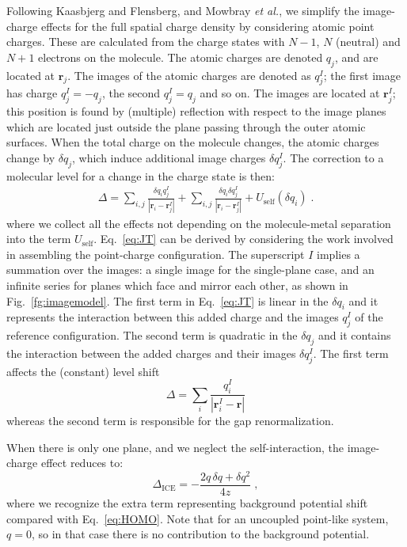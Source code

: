\documentclass[aip,jcp,a4paper,reprint,floatfix,superscriptaddress]{revtex4-1}
\newcommand{\rijI}{|{\bm r}_i-{\bm r}_{j}^I|}
\newcommand{\etal}{\emph{et al.}\xspace}
\newcommand{\txt}[1]{{\text{#1}}}
\begin{document}
Following Kaasbjerg and Flensberg,\cite{Kaasbjerg2008} and Mowbray \etal\cite{Mowbray2008}, we simplify the image-charge effects for the full spatial charge density by considering atomic point charges.
These are calculated from the charge states with $N-1$, $N$ (neutral) and $N+1$ electrons on the molecule. The atomic charges are denoted $q_j$, and are located at ${\bm r}_j$. The images of the atomic charges are denoted as $q^I_j$; the first image has charge $q^I_j= -q_j$, the second $q^I_j = q_j$ and so on.
The images are located at ${\bm r}^I_j$; this position is found by (multiple) reflection with respect to the image planes which are located just outside the plane passing through the outer atomic surfaces.\cite{Smith1989,Quek2007} When the total charge on the molecule changes, the atomic charges change by $\delta q_j$, which induce additional image charges $\delta q^I_j$. The correction to a molecular level for a change in the charge state is then:
\begin{align}
\label{eq:JT}
\Delta = \sum_{i, j} \frac{\delta q_i q_j^I}{\rijI}
+ \sum_{i,j} \frac{\delta q_i \delta q_j^I}{\rijI} + U_\text{self}(\delta q_i)\;.
\end{align}
where we collect all the effects not depending on the molecule-metal separation into the term $U_\txt{self}$.
Eq.~\eqref{eq:JT} can be derived by considering the work involved in assembling the point-charge configuration.
The superscript $I$ implies a summation over the images: a single image for the single-plane case, and an infinite series for  planes which face and mirror each other, as shown in Fig.~\ref{fg:imagemodel}.
The first term in Eq.~\eqref{eq:JT} is linear in the 
$\delta q_i$ and it represents the interaction between this added charge and the images $q^I_j$ of the reference configuration.
The second term is quadratic in the $\delta q_j$ and it contains the interaction between the added charges and their images $\delta q^I_j$. The first term affects the (constant) level shift 
\[
\Delta = \sum_i \frac{q_i^I}{|{\bm r}_i^I - {\bm r}|}
\] 
whereas the second term is responsible for the gap renormalization. 

When there is only one plane, and we neglect the self-interaction, the image-charge effect reduces to:
\[
\Delta_\text{ICE} = - \frac{2q\,\delta q + \delta q^2}{4z}\;,
\]
where we recognize the extra term representing background potential shift compared with Eq.~\eqref{eq:HOMO}. Note that for an uncoupled point-like system, $q=0$, so in that 
case there is no contribution to the background potential.
\end{document}
